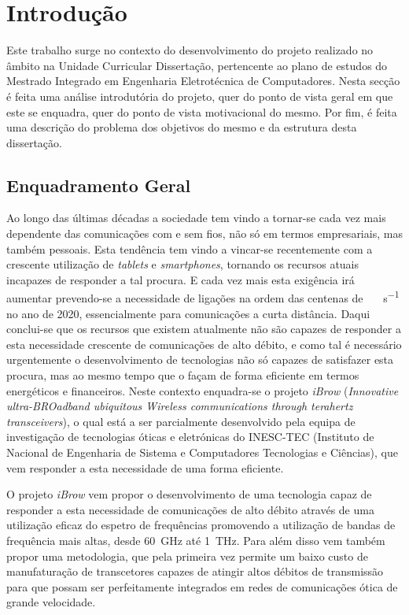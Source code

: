 \chapter{Introdução} \label{chap:intro}

Este trabalho surge no contexto do desenvolvimento do projeto realizado no âmbito na Unidade Curricular Dissertação, pertencente ao plano de estudos do Mestrado Integrado em Engenharia Eletrotécnica de Computadores. Nesta secção é feita uma análise introdutória do projeto, quer do ponto de vista geral em que este se enquadra, quer do ponto de vista motivacional do mesmo. Por fim, é feita uma descrição do problema dos objetivos do mesmo e da estrutura desta dissertação. 


\section{Enquadramento Geral} \label{sec:context}
Ao longo das últimas décadas a sociedade tem vindo a tornar-se cada vez mais dependente das comunicações com e sem fios, não só em termos empresariais, mas também pessoais. Esta tendência tem vindo a vincar-se recentemente com a crescente utilização de \textit{tablets} e \textit{smartphones}, tornando os recursos atuais incapazes de responder a tal procura. E cada vez mais esta exigência irá aumentar prevendo-se a necessidade de ligações na ordem das centenas de \SI{}{\giga\bit\per\second} no ano de 2020, essencialmente para comunicações a curta distância. Daqui conclui-se que os recursos que existem atualmente não são capazes de responder a esta necessidade crescente de comunicações de alto débito, e como tal é necessário urgentemente o desenvolvimento de tecnologias não só capazes de satisfazer esta procura, mas ao mesmo tempo que o façam de forma eficiente em termos energéticos e financeiros. Neste contexto enquadra-se o projeto \textit{iBrow} (\textit{Innovative ultra-BROadband ubiquitous Wireless communications through terahertz transceivers}), o qual está a ser parcialmente desenvolvido pela equipa de investigação de tecnologias óticas e eletrónicas do INESC-TEC (Instituto de Nacional de Engenharia de Sistema e Computadores Tecnologias e Ciências), que vem responder a esta necessidade de uma forma eficiente.

O projeto \textit{iBrow} vem propor o desenvolvimento de uma tecnologia capaz de responder a esta necessidade de comunicações de alto débito através de uma utilização eficaz do espetro de frequências promovendo a utilização de bandas de frequência mais altas, desde \SI{60}{\giga\hertz}  até \SI{1}{\tera\hertz}. Para além disso vem também propor uma metodologia, que pela primeira vez permite um baixo custo de manufaturação de transcetores capazes de atingir altos débitos de transmissão para que possam ser perfeitamente integrados em redes de comunicações ótica de grande velocidade.
 
